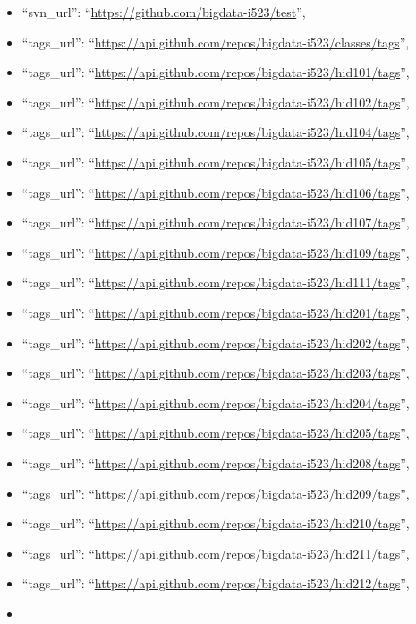 \begin{itemize}
\item
  ``svn\_url'': ``\url{https://github.com/bigdata-i523/test}'',
\item
  ``tags\_url'':
  ``\url{https://api.github.com/repos/bigdata-i523/classes/tags}'',
\item
  ``tags\_url'':
  ``\url{https://api.github.com/repos/bigdata-i523/hid101/tags}'',
\item
  ``tags\_url'':
  ``\url{https://api.github.com/repos/bigdata-i523/hid102/tags}'',
\item
  ``tags\_url'':
  ``\url{https://api.github.com/repos/bigdata-i523/hid104/tags}'',
\item
  ``tags\_url'':
  ``\url{https://api.github.com/repos/bigdata-i523/hid105/tags}'',
\item
  ``tags\_url'':
  ``\url{https://api.github.com/repos/bigdata-i523/hid106/tags}'',
\item
  ``tags\_url'':
  ``\url{https://api.github.com/repos/bigdata-i523/hid107/tags}'',
\item
  ``tags\_url'':
  ``\url{https://api.github.com/repos/bigdata-i523/hid109/tags}'',
\item
  ``tags\_url'':
  ``\url{https://api.github.com/repos/bigdata-i523/hid111/tags}'',
\item
  ``tags\_url'':
  ``\url{https://api.github.com/repos/bigdata-i523/hid201/tags}'',
\item
  ``tags\_url'':
  ``\url{https://api.github.com/repos/bigdata-i523/hid202/tags}'',
\item
  ``tags\_url'':
  ``\url{https://api.github.com/repos/bigdata-i523/hid203/tags}'',
\item
  ``tags\_url'':
  ``\url{https://api.github.com/repos/bigdata-i523/hid204/tags}'',
\item
  ``tags\_url'':
  ``\url{https://api.github.com/repos/bigdata-i523/hid205/tags}'',
\item
  ``tags\_url'':
  ``\url{https://api.github.com/repos/bigdata-i523/hid208/tags}'',
\item
  ``tags\_url'':
  ``\url{https://api.github.com/repos/bigdata-i523/hid209/tags}'',
\item
  ``tags\_url'':
  ``\url{https://api.github.com/repos/bigdata-i523/hid210/tags}'',
\item
  ``tags\_url'':
  ``\url{https://api.github.com/repos/bigdata-i523/hid211/tags}'',
\item
  ``tags\_url'':
  ``\url{https://api.github.com/repos/bigdata-i523/hid212/tags}'',
\item

\end{itemize}
